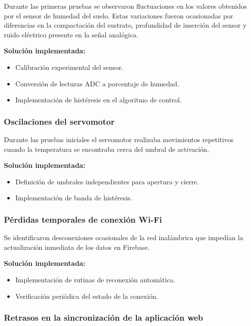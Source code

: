 \documentclass[conference]{IEEEtran}
\begin{document}
Durante las primeras pruebas se observaron fluctuaciones en los valores obtenidos por el sensor de humedad del suelo. Estas variaciones fueron ocasionadas por diferencias en la compactación del sustrato, profundidad de inserción del sensor y ruido eléctrico presente en la señal analógica.

\textbf{Solución implementada:}
\begin{itemize}
    \item Calibración experimental del sensor.
    \item Conversión de lecturas ADC a porcentaje de humedad.
    \item Implementación de histéresis en el algoritmo de control.
\end{itemize}

\subsubsection{Oscilaciones del servomotor}

Durante las pruebas iniciales el servomotor realizaba movimientos repetitivos cuando la temperatura se encontraba cerca del umbral de activación.

\textbf{Solución implementada:}
\begin{itemize}
    \item Definición de umbrales independientes para apertura y cierre.
    \item Implementación de banda de histéresis.
\end{itemize}

\subsubsection{Pérdidas temporales de conexión Wi-Fi}

Se identificaron desconexiones ocasionales de la red inalámbrica que impedían la actualización inmediata de los datos en Firebase.

\textbf{Solución implementada:}
\begin{itemize}
    \item Implementación de rutinas de reconexión automática.
    \item Verificación periódica del estado de la conexión.
\end{itemize}

\subsubsection{Retrasos en la sincronización de la aplicación web}
\end{document}
